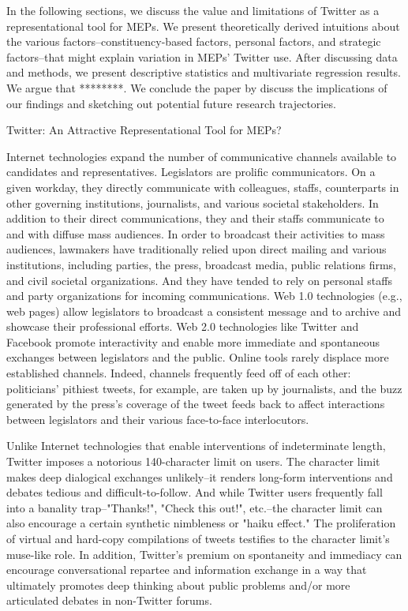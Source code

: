 \documentclass{article}\usepackage[]{graphicx}\usepackage[]{color}
\begin{document}
	In the following sections, we discuss the value and limitations of Twitter as a representational tool for MEPs. We present theoretically derived intuitions about the various factors--constituency-based factors, personal factors, and strategic factors--that might explain variation in MEPs' Twitter use. After discussing data and methods, we present descriptive statistics and multivariate regression results. We argue that ********. We conclude the paper by discuss the implications of our findings and sketching out potential future research trajectories.
	
	
 Twitter: An Attractive Representational Tool for MEPs? 

	Internet technologies expand the number of communicative channels available to candidates and representatives. Legislators are prolific communicators. On a given workday, they directly communicate with colleagues, staffs, counterparts in other governing institutions, journalists, and various societal stakeholders. In addition to their direct communications, they and their staffs communicate to and with diffuse mass audiences. In order to broadcast their activities to mass audiences, lawmakers have traditionally relied upon direct mailing and various institutions, including parties, the press, broadcast media, public relations firms, and civil societal organizations. And they have tended to rely on personal staffs and party organizations for incoming communications. Web 1.0 technologies (e.g., web pages) allow legislators to broadcast a consistent message and to archive and showcase their professional efforts\citep*{adler.gent.overmeyer.1998}. Web 2.0 technologies like Twitter and Facebook promote interactivity and enable more immediate and spontaneous exchanges between legislators and the public. Online tools rarely displace more established channels. Indeed, channels frequently feed off of each other: politicians' pithiest tweets, for example, are taken up by journalists, and the buzz generated by the press's coverage of the tweet feeds back to affect interactions between legislators and their various face-to-face interlocutors.

	Unlike Internet technologies that enable interventions of indeterminate length, Twitter imposes a notorious 140-character limit on users. The character limit makes deep dialogical exchanges unlikely--it renders long-form interventions and debates tedious and difficult-to-follow. And while Twitter users frequently fall into a banality trap--"Thanks!", "Check this out!", etc.--the character limit can also encourage a certain synthetic nimbleness or "haiku effect." The proliferation of virtual and hard-copy compilations of tweets testifies to the character limit's muse-like role. In addition, Twitter's premium on spontaneity and immediacy can encourage conversational repartee and information exchange in a way that ultimately promotes deep thinking about public problems and/or more articulated debates in non-Twitter forums. 
\end{document}
